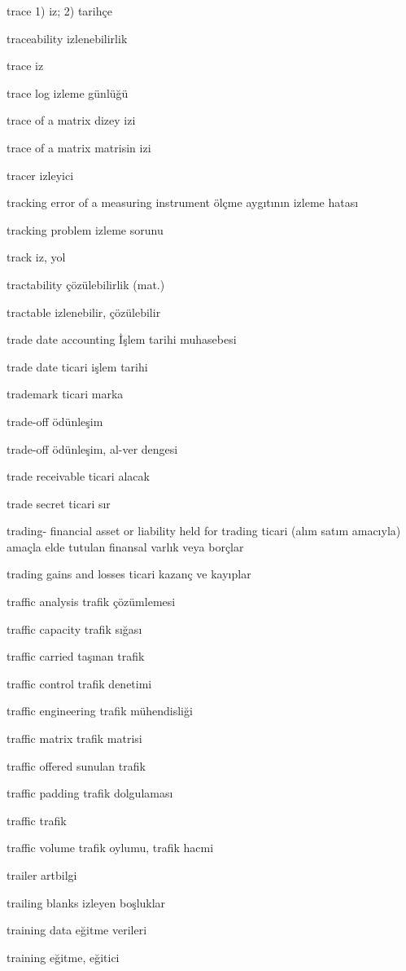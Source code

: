 \documentclass[12pt,fleqn]{article}\usepackage{../../common}
\begin{document}
trace 1) iz; 2) tarihçe

traceability izlenebilirlik

trace iz

trace log izleme günlüğü

trace of a matrix dizey izi

trace of a matrix matrisin izi

tracer izleyici

tracking error of a measuring instrument ölçme aygıtının izleme hatası

tracking problem izleme sorunu

track iz, yol

tractability çözülebilirlik (mat.)

tractable izlenebilir, çözülebilir

trade date accounting İşlem tarihi muhasebesi

trade date ticari işlem tarihi

trademark ticari marka

trade-off ödünleşim

trade-off ödünleşim, al-ver dengesi

trade receivable ticari alacak

trade secret ticari sır

trading- financial asset or liability held for trading ticari (alım satım amacıyla) amaçla elde tutulan finansal varlık veya borçlar

trading gains and losses ticari kazanç ve kayıplar

traffic analysis trafik çözümlemesi

traffic capacity trafik sığası

traffic carried taşınan trafik

traffic control trafik denetimi

traffic engineering trafik mühendisliği

traffic matrix trafik matrisi

traffic offered sunulan trafik

traffic padding trafik dolgulaması

traffic trafik

traffic volume trafik oylumu, trafik hacmi

trailer artbilgi

trailing blanks izleyen boşluklar

training data eğitme verileri

training eğitme, eğitici
\end{document}

